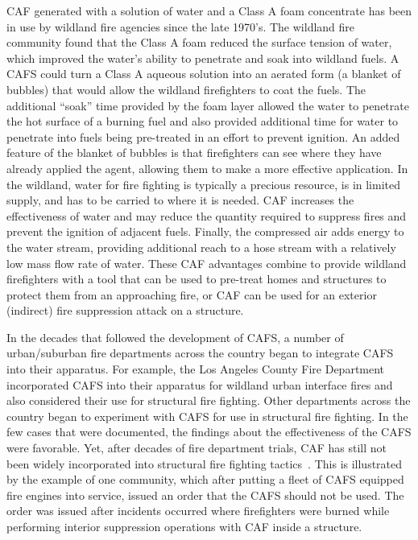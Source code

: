 \documentclass[12pt,oneside]{book}
\begin{document}
CAF generated with a solution of water and a Class A foam concentrate has been in use by wildland fire agencies since the late 1970's. The wildland fire community found that the Class A foam reduced the surface tension of water, which improved the water's ability to penetrate and soak into wildland fuels. A CAFS could turn a Class A aqueous solution into an aerated form (a blanket of bubbles) that would allow the wildland firefighters to coat the fuels. The additional ``soak'' time provided by the foam layer allowed the water to penetrate the hot surface of a burning fuel and also provided additional time for water to penetrate into fuels being pre-treated in an effort to prevent ignition. An added feature of the blanket of bubbles is that firefighters can see where they have already applied the agent, allowing them to make a more effective application. In the wildland, water for fire fighting is typically a precious resource, is in limited supply, and has to be carried to where it is needed. CAF increases the effectiveness of water and may reduce the quantity required to suppress fires and prevent the ignition of adjacent fuels. Finally, the compressed air adds energy to the water stream, providing additional reach to a hose stream with a relatively low mass flow rate of water. These CAF advantages combine to provide wildland firefighters with a tool that can be used to pre-treat homes and structures to protect them from an approaching fire, or CAF can be used for an exterior (indirect) fire suppression attack on a structure.

In the decades that followed the development of CAFS, a number of urban/suburban fire departments across the country began to integrate CAFS into their apparatus. For example, the Los Angeles County Fire Department incorporated CAFS into their apparatus for wildland urban interface fires and also considered their use for structural fire fighting. Other departments across the country began to experiment with CAFS for use in structural fire fighting. In the few cases that were documented, the findings about the effectiveness of the CAFS were favorable. Yet, after decades of fire department trials, CAF has still not been widely incorporated into structural fire fighting tactics~\cite{USFA:CAFS,Lorh:2002}. This is illustrated by the example of one community, which after putting a fleet of CAFS equipped fire engines into service, issued an order that the CAFS should not be used. The order was issued after incidents occurred where firefighters were burned while performing interior suppression operations with CAF inside a structure.
\end{document}
